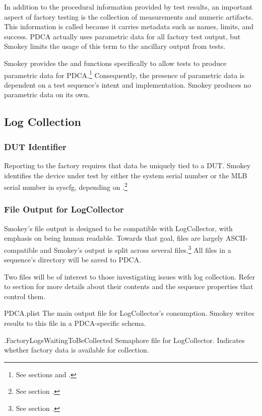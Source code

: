 In addition to the procedural information provided by test results, an
important aspect of factory testing is the collection of measurements and
numeric artifacts.  This information is called  because
it carries metadata such as names, limits, and success.  PDCA actually uses
parametric data for all factory test output, but Smokey limits the usage of
this term to the ancillary output from tests.

Smokey provides the  and  functions
specifically to allow tests to produce parametric data for PDCA.\footnote{See
sections  and .}
Consequently, the presence of parametric data is dependent on a test sequence's
intent and implementation.  Smokey produces no parametric data on its own.

\subsection{Log Collection}

\subsubsection{DUT Identifier}

Reporting to the factory requires that data be uniquely tied to a DUT.  Smokey
identifies the device under test by either the system serial number
 or the MLB serial number  in syscfg, depending on
.\footnote{See section .}

\subsubsection{File Output for LogCollector}
\label{sec:LogCollectorFiles}

Smokey's file output is designed to be compatible with LogCollector, with
emphasis on being human readable.  Towards that goal, files are largely
ASCII-compatible and Smokey's output is split across several
files.\footnote{See section .}  All files in a
sequence's directory will be saved to PDCA.

Two files will be of interest to those investigating issues with log
collection.  Refer to section  for more details
about their contents and the sequence properties that control them.

\begin{Definition}

	\item[PDCA.plist] The main output file for LogCollector's consumption.
	Smokey writes results to this file in a PDCA-specific schema.

	\item[.FactoryLogsWaitingToBeCollected] Semaphore file for
	LogCollector.  Indicates whether factory data is available for
	collection.

\end{Definition}

